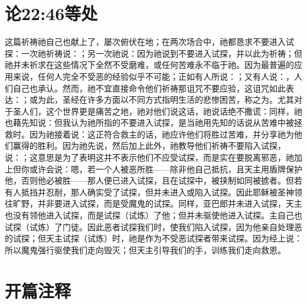 \section{论22:46等处}

这篇祈祷祂自己也献上了，屡次俯伏在地；在两次场合中，祂都恳求不要进入试探：一次祂祈祷说：；另一次祂说：因为祂说到不要进入试探，并以此为祈祷；但祂并未祈求在这些情况下全然不受磨难，或任何苦难永不临于祂。因为最普遍的应用来说，任何人完全不受恶的经验似乎不可能；正如有人所说：；又有人说：，人们自己也承认。然而，祂不宜直接命令他们祈祷那诅咒不要应验，这诅咒如此表达：；或为此，圣经在许多方面以不同方式指明生活的悲惨困苦，称之为。尤其对于圣人们，这个世界更是痛苦之地，祂对他们说这话，祂说话绝不撒谎：同样，祂也藉先知说：但我认为祂所指的不要进入试探，是当祂用先知的话说从苦难中被拯救时。因为祂接着说：这正符合救主的话，祂应许他们将胜过苦难，并分享祂为他们赢得的胜利。因为祂先说，然后加上此外，祂教导他们祈祷不要陷入试探，说：；这意思是为了表明这并不表示他们不应受试探，而是实在要脱离邪恶，祂加上但你或许会说：嗯，若一个人被恶所胜——除非他自己抵抗，且天主用盾牌保护他，否则他必被胜——那人便已进入试探，且在试探中，被挟制如同被掳者。但若有人抵挡并忍耐，那人确实受了试探，但并未进入或陷入试探。因此耶稣被圣神领往旷野，并非要进入试探，而是受魔鬼的试探。同样，亚巴郎并未进入试探，天主也没有领他进入试探，而是试探（试炼）了他；但并未驱使他进入试探。主自己也试探（试炼）了门徒。因此恶者试探我们时，使我们陷入试探，因为他亲自处理恶的试探；但天主试探（试炼）时，祂是作为不受恶试探者带来试探。因为经上说：所以魔鬼强行驱使我们走向毁灭；但天主引导我们的手，训练我们走向救恩。\par


\section{开篇注释}


